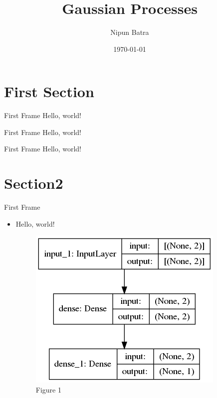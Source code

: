 \documentclass[xcolor=dvipsnames]{beamer}
\title{Gaussian Processes}
\date{\today}
\author{Nipun Batra}
\institute{Machine Learning CS 612}
\begin{document}
  \maketitle
  \section{First Section}
  \begin{frame}{First Frame}
    Hello, world!
  \end{frame}
  \begin{frame}{First Frame}
Hello, world!
\end{frame}
  \begin{frame}{First Frame}
Hello, world!
\end{frame}

\section{Section2}
  \begin{frame}{First Frame}
  \begin{itemize}
  	\item Hello, world!
\begin{figure}
	\includegraphics[scale=0.3]{../notebooks/model}
	\caption{Figure 1}
	\label{fig:model}
\end{figure}
  \end{itemize}

\end{frame}
\begin{frame}



%
\end{frame}
\end{document}
